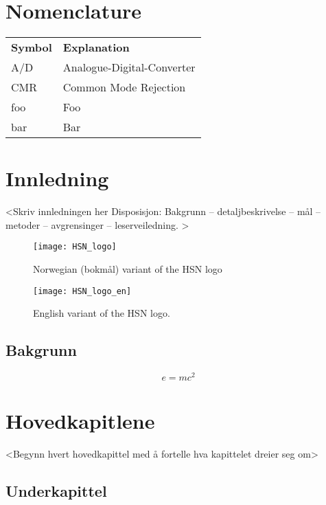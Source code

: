\documentclass[%
    norsk,  %
]{USN-BSc}
\begin{document}
\chapter*{Nomenclature}
\label{sec:nomenclature}

\begin{longtable}{ll}
  \textbf{Symbol} & \textbf{Explanation}\endhead\\
  A/D	& Analogue-Digital-Converter \\
  CMR	& Common Mode Rejection \\
  foo	& Foo \\
  bar 	& Bar
\end{longtable}



\chapter{Innledning}
\label{ch:intro}

<Skriv innledningen her
Disposisjon: Bakgrunn – detaljbeskrivelse – mål – metoder – avgrensinger – leserveiledning.
>

\lipsum[4]
\begin{figure}[!ht]
  \centering
  \texttt{[image: HSN\_logo]}
  \caption{Norwegian (bokmål) variant of the HSN logo}
  \label{fig:hsn-logo}
\end{figure}
\lipsum[4]
\begin{figure}[!ht]
  \centering
  \texttt{[image: HSN\_logo\_en]}
  \caption{English variant of the HSN logo.}
  \label{fig:hsn-logo-en}
\end{figure}
\lipsum



\section{Bakgrunn}
\label{sec:back}
\lipsum[4]
\begin{equation}
  e = m c^2
\end{equation}
\lipsum

\chapter{Hovedkapitlene}
\label{ch:main}
<Begynn hvert hovedkapittel med å fortelle hva kapittelet dreier seg om>

\section{Underkapittel}
\label{sec:theory}
\end{document}
